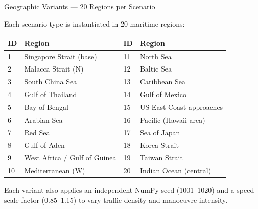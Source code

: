 \documentclass[aspectratio=169,11pt]{beamer}
\begin{document}
\begin{frame}{Geographic Variants — 20 Regions per Scenario}

  Each scenario type is instantiated in 20 maritime regions:

  \medskip
  \small
  \begin{tabularx}{\textwidth}{@{}lXlX@{}}
    \toprule
    \textbf{ID} & \textbf{Region} & \textbf{ID} & \textbf{Region} \\
    \midrule
     1 & Singapore Strait (base)    & 11 & North Sea \\
     2 & Malacca Strait (N)         & 12 & Baltic Sea \\
     3 & South China Sea            & 13 & Caribbean Sea \\
     4 & Gulf of Thailand           & 14 & Gulf of Mexico \\
     5 & Bay of Bengal              & 15 & US East Coast approaches \\
     6 & Arabian Sea                & 16 & Pacific (Hawaii area) \\
     7 & Red Sea                    & 17 & Sea of Japan \\
     8 & Gulf of Aden               & 18 & Korea Strait \\
     9 & West Africa / Gulf of Guinea & 19 & Taiwan Strait \\
    10 & Mediterranean (W)          & 20 & Indian Ocean (central) \\
    \bottomrule
  \end{tabularx}

  \medskip
  Each variant also applies an independent NumPy seed (1001–1020) and a
  speed scale factor (0.85–1.15) to vary traffic density and manoeuvre intensity.
\end{frame}
\end{document}
